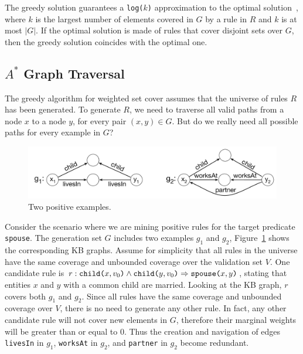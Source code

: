 The greedy solution guarantees a \texttt{log($k$)} approximation
to the optimal solution~\cite{chvatal1979greedy}, where $k$ is the largest number of elements covered in $G$ by a rule in $R$ and $k$ is at most $|G|$. 
If the optimal solution is made of 
rules that cover disjoint sets over $G$, then the greedy solution coincides with the optimal one.

\vspace{-1ex}
\subsection{$A^*$ Graph Traversal}
\vspace{-1ex}
The greedy algorithm for weighted set cover assumes that the universe of rules $R$ has been generated.
To generate $R$, we need to traverse all valid paths from a node $x$ to a node $y$, for every pair $(x,y) \in G$. But do we really need all possible paths for every example in $G$?

	\begin{figure}[htb]
		\centering
		\includegraphics[width=0.99\columnwidth]{include/figure/a*_graph_example.pdf}	
		\vspace{-5ex}
		\caption{Two positive examples.}
	\label{fig:positive_examples}
		\vspace{-0.5ex}
\end{figure}

\begin{example}
	Consider the scenario where we are mining positive rules for the target predicate \texttt{spouse}. The generation set $G$ includes two examples $g_1$ and $g_2$, Figure~\ref{fig:positive_examples} shows the corresponding KB graphs. %
	Assume for simplicity that all rules in the universe have the same coverage and unbounded coverage over the validation set $V$.
	One candidate rule is $r : \texttt{child(}x,v_0\texttt{)} \wedge \texttt{child(}y,v_0\texttt{)} \Rightarrow \texttt{spouse(}x,y\texttt{)}$, stating that entities $x$ and $y$ with a common child are married. Looking at the KB graph, $r$ covers both $g_1$ and $g_2$.
	Since all rules have the same coverage and unbounded coverage over $V$, 
	there is no need to generate any other rule. In fact, any other candidate rule will not cover new elements in $G$, therefore their marginal weights will be greater than or equal to $0$. 
	Thus the creation and navigation of edges \texttt{livesIn} in $g_1$, \texttt{worksAt} in $g_2$, and \texttt{partner} in $g_2$ become redundant.
\end{example}

